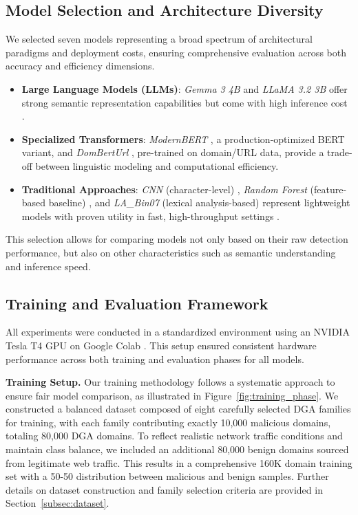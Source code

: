 \documentclass[a4paper]{llncs}
\begin{document}
\subsection{Model Selection and Architecture Diversity}

We selected seven models representing a broad spectrum of architectural paradigms and deployment costs, ensuring comprehensive evaluation across both accuracy and efficiency dimensions.

\begin{itemize}
    \item \textbf{Large Language Models (LLMs)}: \textit{Gemma 3 4B} \cite{gemma_docs_2024,gemma3-4b-it} and \textit{LLaMA 3.2 3B} \cite{llama3_hf_2024} offer strong semantic representation capabilities but come with high inference cost \cite{la2024llms,sayed2024fine}.
    \item \textbf{Specialized Transformers}: \textit{ModernBERT} \cite{modernbert_hf_2024}, a production-optimized BERT variant, and \textit{DomBertUrl} \cite{mahdaouy2024domurls_bert}, pre-trained on domain/URL data, provide a trade-off between linguistic modeling and computational efficiency.
    \item \textbf{Traditional Approaches}: \textit{CNN} (character-level) \cite{catania2019analysis}, \textit{Random Forest} (feature-based baseline) \cite{Vu2021}, and \textit{LA\_Bin07} (lexical analysis-based) represent lightweight models with proven utility in fast, high-throughput settings \cite{tuan2022detecting}.
\end{itemize}

This selection allows for comparing models not only based on their raw detection performance, but also on other characteristics such as semantic understanding and inference speed.






\subsection{Training and Evaluation Framework}
All experiments were conducted in a standardized environment using an NVIDIA Tesla T4 GPU on Google Colab \cite{google_colab}. This setup ensured consistent hardware performance across both training and evaluation phases for all models.

\textbf{Training Setup.} Our training methodology follows a systematic approach to ensure fair model comparison, as illustrated in Figure~\ref{fig:training_phase}. We constructed a balanced dataset composed of eight carefully selected DGA families for training, with each family contributing exactly 10,000 malicious domains, totaling 80,000 DGA domains. To reflect realistic network traffic conditions and maintain class balance, we included an additional 80,000 benign domains sourced from legitimate web traffic. This results in a comprehensive 160K domain training set with a 50-50 distribution between malicious and benign samples. Further details on dataset construction and family selection criteria are provided in Section~\ref{subsec:dataset}. 
\end{document}

